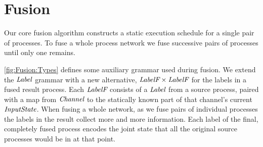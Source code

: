 


\section{Fusion}
\label{s:Fusion}

Our core fusion algorithm constructs a static execution schedule for a single pair of processes. To fuse a whole process network we fuse successive pairs of processes until only one remains.

\autoref{fig:Fusion:Types} defines some auxiliary grammar used during fusion. We extend the $\textit{Label}$ grammar with a new alternative, $\textit{LabelF} \times \textit{LabelF}$ for the labels in a fused result process. Each $\textit{LabelF}$ consists of a $\textit{Label}$ from a source process, paired with a map from $\textit{Channel}$ to the statically known part of that channel's current $\textit{InputState}$. When fusing a whole network, as we fuse pairs of individual processes the labels in the result collect more and more information. Each label of the final, completely fused process encodes the joint state that all the original source processes would be in at that point.


